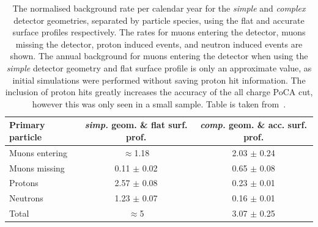\begin{table}
  \caption[The normalised background rate per calendar year for the \emph{simple} detector geometry and flat surface profile, and for the \emph{complex} geometry and accurate surface profile]
          {The normalised background rate per calendar year for the \emph{simple} and \emph{complex} detector geometries, separated by particle species, using the flat and accurate surface profiles respectively. The rates for muons entering the detector, muons missing the detector, proton induced events, and neutron induced events are shown. The annual background for muons entering the detector when using the \emph{simple} detector geometry and flat surface profile is only an approximate value, as initial simulations were performed without saving proton hit information. The inclusion of proton hits greatly increases the accuracy of the all charge PoCA cut, however this was only seen in a small sample. Table is taken from~\citep{MartinsThesis}.}
  \centering
  \label{tab:FinalSurfRates}
  \begin{tabular}{l c c}
    \toprule
        {Primary particle} & {\emph{simp.} geom. \& flat surf. prof.} & {\emph{comp.} geom. \& acc. surf. prof.} \\ 
        \midrule
        Muons entering     & $\approx$1.18     & 2.03 $\pm$ 0.24 \\

        Muons missing      & 0.11 $\pm$ 0.02   & 0.65 $\pm$ 0.08 \\

        Protons            & 2.57 $\pm$ 0.08   & 0.23 $\pm$ 0.01 \\

        Neutrons           & 1.23 $\pm$ 0.07   & 0.16 $\pm$ 0.01 \\

        Total              & $\approx$5        & 3.07 $\pm$ 0.25 \\
    \bottomrule
  \end{tabular}
\end{table}

